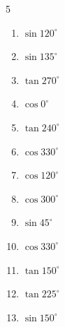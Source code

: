 \begin{multicols}{5}
\begin{enumerate}
  \item $\displaystyle \sin{120^\circ}$


  \item $\displaystyle \sin{135^\circ}$


  \item $\displaystyle \tan{270^\circ}$

        \phantom{$\displaystyle なし$}

  \item $\displaystyle \cos{0^\circ}$

        \phantom{$\displaystyle =1$}

  \item $\displaystyle \tan{240^\circ}$


\columnbreak %

  \item $\displaystyle \cos{330^\circ}$


  \item $\displaystyle \cos{120^\circ}$


  \item $\displaystyle \cos{300^\circ}$


  \item $\displaystyle \sin{45^\circ}$


  \item $\displaystyle \cos{330^\circ}$


  \item $\displaystyle \tan{150^\circ}$


  \item $\displaystyle \tan{225^\circ}$

        \phantom{$\displaystyle =1$}

  \item $\displaystyle \sin{150^\circ}$


\end{enumerate}
\end{multicols}
